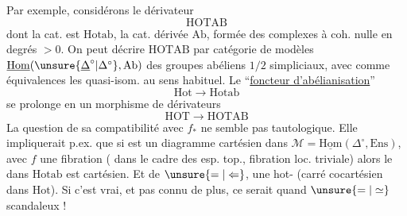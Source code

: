Par exemple, considérons le dérivateur
\[
\mathrm{HOTAB}
\]
dont la cat.  est $\mathrm{Hotab}$, la  cat. dérivée
   $\mathrm{Ab}$,  formée des complexes  à coh. nulle en degrés $>0$.
On peut décrire $\mathrm{HOTAB}$ par  catégorie de modèles $\underline{\mathrm{Hom}}(\unsure{\underline{\Delta}^{\circ}|\Delta^{\circ}},\mathrm{Ab})$ des groupes abéliens $1/2$ simpliciaux, avec comme équivalences  les quasi-isom. au sens habituel. Le ``\uline{foncteur d'abélianisation}''  
\[
\mathrm{Hot}\longrightarrow\mathrm{Hotab}
\]
se prolonge en un morphisme de dérivateurs
\[
\mathrm{HOT}\longrightarrow\mathrm{HOTAB}
\]
La question de sa compatibilité avec $f_*$ ne semble pas tautologique. Elle  impliquerait p.ex. que si
est un diagramme cartésien dans $\mathcal M=\underline{\mathrm{Hom}}(\Delta^\circ,\mathrm{Ens})$,
avec $f$ une fibration ( dans le cadre des esp. top.,   fibration loc. triviale) alors le  dans $\mathrm{Hotab}$
est cartésien.  Et de $\unsure{=|\Leftarrow}$,  une hot- (carré cocartésien dans $\mathrm{Hot}$).
Si c'est vrai, et pas connu de plus, ce serait quand $\unsure{=|\simeq}$ scandaleux !

